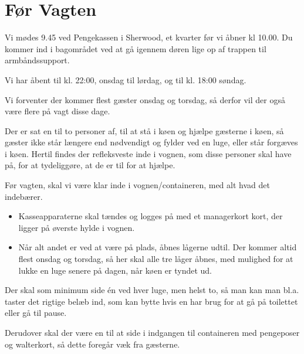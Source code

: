 \section{Før Vagten}
\label{sec:pre-vagten}

Vi mødes 9.45 ved Pengekassen i Sherwood, et kvarter før vi åbner kl 10.00.
Du kommer ind i bagområdet ved at gå igennem døren lige op af trappen til armbåndssupport.

Vi har åbent til kl. 22:00, onsdag til lørdag, og til kl. 18:00 søndag.

Vi forventer der kommer flest gæster onsdag og torsdag, 
så derfor vil der også være flere på vagt disse dage.

Der er sat en til to personer af, til at stå i køen og hjælpe gæsterne i køen, 
så gæster ikke står længere end nødvendigt og fylder ved en luge, eller står forgæves i køen.
Hertil findes der refleksveste inde i vognen, som disse personer skal have på, 
for at tydeliggøre, at de er til for at hjælpe.

Før vagten, skal vi være klar inde i vognen/containeren, med alt hvad det indebærer. 
\begin{itemize}
	\item Kasseapparaterne skal tændes og logges på med et managerkort kort, der ligger på øverste hylde i vognen.
	\item Når alt andet er ved at være på plads, åbnes
	lågerne udtil. Der kommer altid flest onsdag og torsdag, så her skal alle tre låger åbnes, 
	med mulighed for at lukke en luge senere på dagen, når køen er tyndet ud.
\end{itemize}

Der skal som minimum side én ved hver luge, men helst to, så man kan man bl.a. taster det rigtige belæb ind, 
som kan bytte hvis en har brug for at gå på toilettet eller gå til pause.

Derudover skal der være en til at side i indgangen til containeren med pengeposer og walterkort, 
så dette foregår væk fra gæsterne.
